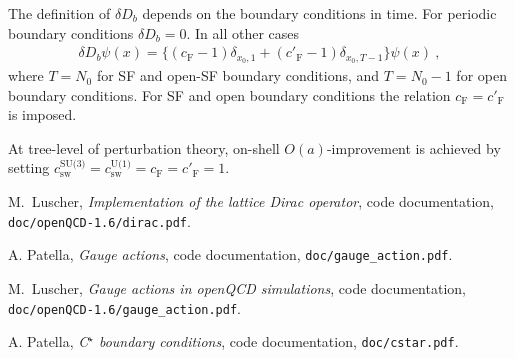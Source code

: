 \documentclass[11pt,fleqn]{article}
\begin{document}
The definition of $\delta D_b$ depends on the boundary conditions in time. For periodic boundary conditions $\delta D_b=0$. In all other cases
\begin{gather}
   \delta D_b \psi(x)
   =
   \{ (c_\text{F}-1) \delta_{x_0,1} + (c'_\text{F}-1) \delta_{x_0,T-1} \} \psi(x) \ ,
\end{gather} 
where $T=N_0$ for SF and open-SF boundary conditions, and $T=N_0-1$ for open boundary conditions. For SF and open boundary conditions the relation $c_\text{F} = c'_\text{F}$ is imposed.

At tree-level of perturbation theory, on-shell $O(a)$-improvement is achieved by setting $c^\text{SU(3)}_\text{sw} = c^\text{U(1)}_\text{sw} = c_\text{F} = c'_\text{F} = 1$.


\begin{thebibliography}{9}

  M.~Luscher,
  \textit{Implementation of the lattice Dirac operator}, code documentation,
  \texttt{doc/openQCD-1.6/dirac.pdf}.

  A. Patella,
  \textit{Gauge actions}, code documentation,
  \texttt{doc/gauge\_action.pdf}.

  M.~Luscher,
  \textit{Gauge actions in openQCD simulations}, code documentation,
  \texttt{doc/openQCD-1.6/gauge\_action.pdf}.

  A. Patella,
  \textit{C$^\star$ boundary conditions}, code documentation,
  \texttt{doc/cstar.pdf}.

\end{thebibliography}
\end{document}
